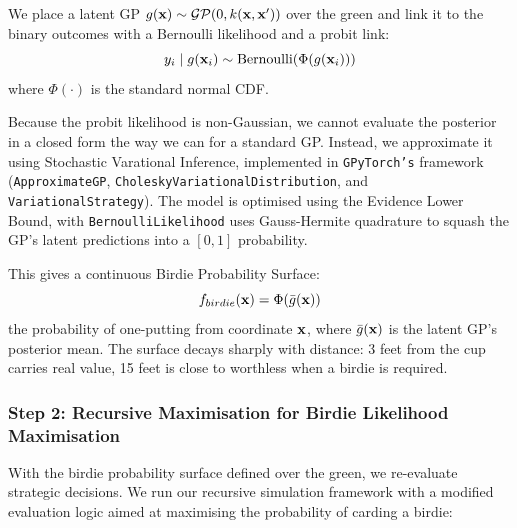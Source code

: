\documentclass[11pt, letterpaper]{article}
\begin{document}
We place a latent GP $g(\mathbf{x}) \sim \mathcal{GP}(0, k(\mathbf{x},\mathbf{x}'))$ over the green and link it to the binary outcomes with a Bernoulli likelihood and a probit link:
\[y_i \mid g(\mathbf{x}_i) \sim \text{Bernoulli}(\Phi(g(\mathbf{x}_i)))\]
where $\Phi(\cdot)$ is the standard normal CDF.

Because the probit likelihood is non-Gaussian, we cannot evaluate the posterior in a closed form the way we can for a standard GP. Instead, we approximate it using Stochastic Varational Inference, implemented in \texttt{GPyTorch's} framework (\texttt{ApproximateGP}, \texttt{CholeskyVariationalDistribution}, and \texttt{VariationalStrategy}). The model is optimised using the Evidence Lower Bound, with \texttt{BernoulliLikelihood} uses Gauss-Hermite quadrature to squash the GP's latent predictions into a $[0,1]$ probability.

This gives a continuous Birdie Probability Surface:
\[f_{birdie}(\mathbf{x}) = \Phi(\bar g(\mathbf{x}))\]
the probability of one-putting from coordinate $\mathbf{x}$, where $\bar g(\mathbf{x})$ is the latent GP's posterior mean. The surface decays sharply with distance: 3 feet from the cup carries real value, 15 feet is close to worthless when a birdie is required. 


\subsubsection{Step 2: Recursive Maximisation for Birdie Likelihood Maximisation}
With the birdie probability surface defined over the green, we re-evaluate strategic decisions. We run our recursive simulation framework with a modified evaluation logic aimed at maximising the probability of carding a birdie:
\end{document}
